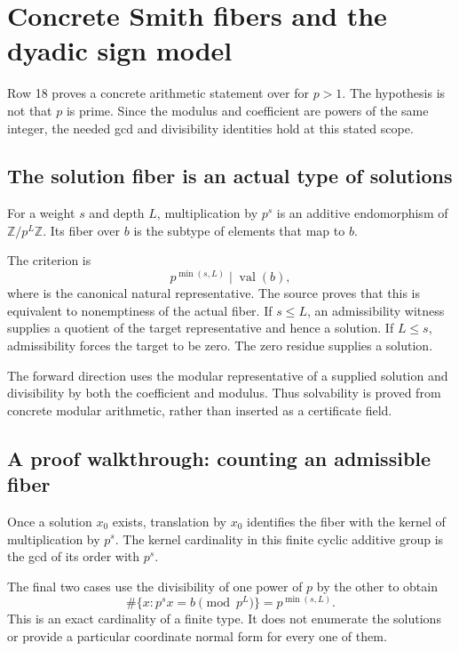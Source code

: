 \section{Concrete Smith fibers and the dyadic sign model}\label{sec:smith}

Row 18 proves a concrete arithmetic statement over  for $p>1$. The hypothesis is not that $p$ is prime. Since the modulus and coefficient are powers of the same integer, the needed gcd and divisibility identities hold at this stated scope.

\subsection{The solution fiber is an actual type of solutions}

For a weight $s$ and depth $L$, multiplication by $p^s$ is an additive endomorphism of $\mathbb Z/p^L\mathbb Z$. Its fiber over $b$ is the subtype of elements that map to $b$.

The criterion is
\[
p^{\min(s,L)}\mid\operatorname{val}(b),
\]
where  is the canonical natural representative. The source proves that this is equivalent to nonemptiness of the actual fiber. If $s\le L$, an admissibility witness supplies a quotient of the target representative and hence a solution. If $L\le s$, admissibility forces the target to be zero. The zero residue supplies a solution.

The forward direction uses the modular representative of a supplied solution and divisibility by both the coefficient and modulus. Thus solvability is proved from concrete modular arithmetic, rather than inserted as a certificate field.

\subsection{A proof walkthrough: counting an admissible fiber}

Once a solution $x_0$ exists, translation by $x_0$ identifies the fiber with the kernel of multiplication by $p^s$. The kernel cardinality in this finite cyclic additive group is the gcd of its order with $p^s$.

The final two cases use the divisibility of one power of $p$ by the other to obtain
\[
\#\{x:p^sx=b\pmod {p^L}\}=p^{\min(s,L)}.
\]
This is an exact cardinality of a finite type. It does not enumerate the solutions or provide a particular coordinate normal form for every one of them.

